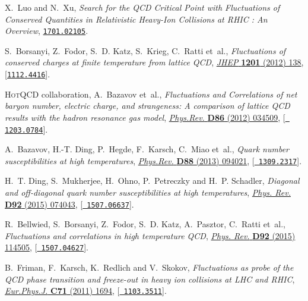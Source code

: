 \documentclass{PoS}
\begin{document}
\begin{thebibliography}{100}
X.~Luo and N.~Xu, \emph{{Search for the QCD Critical Point with Fluctuations of
  Conserved Quantities in Relativistic Heavy-Ion Collisions at RHIC : An
  Overview}},  \href{https://arxiv.org/abs/1701.02105}{{\tt 1701.02105}}.

S.~Borsanyi, Z.~Fodor, S.~D. Katz, S.~Krieg, C.~Ratti et~al.,
  \emph{{Fluctuations of conserved charges at finite temperature from lattice
  QCD}}, \href{http://dx.doi.org/10.1007/JHEP01(2012)138}{\emph{JHEP} {\bf
  1201} (2012) 138}, [\href{https://arxiv.org/abs/1112.4416}{{\tt 1112.4416}}].

{\scshape HotQCD} collaboration, A.~Bazavov et~al., \emph{{Fluctuations and
  Correlations of net baryon number, electric charge, and strangeness: A
  comparison of lattice QCD results with the hadron resonance gas model}},
  \href{http://dx.doi.org/10.1103/PhysRevD.86.034509}{\emph{Phys.Rev.} {\bf
  D86} (2012) 034509}, [\href{https://arxiv.org/abs/1203.0784}{{\tt
  1203.0784}}].

A.~Bazavov, H.-T. Ding, P.~Hegde, F.~Karsch, C.~Miao et~al., \emph{{Quark
  number susceptibilities at high temperatures}},
  \href{http://dx.doi.org/10.1103/PhysRevD.88.094021}{\emph{Phys.Rev.} {\bf
  D88} (2013) 094021}, [\href{https://arxiv.org/abs/1309.2317}{{\tt
  1309.2317}}].

H.~T. Ding, S.~Mukherjee, H.~Ohno, P.~Petreczky and H.~P. Schadler,
  \emph{{Diagonal and off-diagonal quark number susceptibilities at high
  temperatures}},
  \href{http://dx.doi.org/10.1103/PhysRevD.92.074043}{\emph{Phys. Rev.} {\bf
  D92} (2015) 074043}, [\href{https://arxiv.org/abs/1507.06637}{{\tt
  1507.06637}}].

R.~Bellwied, S.~Borsanyi, Z.~Fodor, S.~D. Katz, A.~Pasztor, C.~Ratti et~al.,
  \emph{{Fluctuations and correlations in high temperature QCD}},
  \href{http://dx.doi.org/10.1103/PhysRevD.92.114505}{\emph{Phys. Rev.} {\bf
  D92} (2015) 114505}, [\href{https://arxiv.org/abs/1507.04627}{{\tt
  1507.04627}}].

B.~Friman, F.~Karsch, K.~Redlich and V.~Skokov, \emph{{Fluctuations as probe of
  the QCD phase transition and freeze-out in heavy ion collisions at LHC and
  RHIC}},
  \href{http://dx.doi.org/10.1140/epjc/s10052-011-1694-2}{\emph{Eur.Phys.J.}
  {\bf C71} (2011) 1694}, [\href{https://arxiv.org/abs/1103.3511}{{\tt
  1103.3511}}].


\end{thebibliography}
\end{document}
